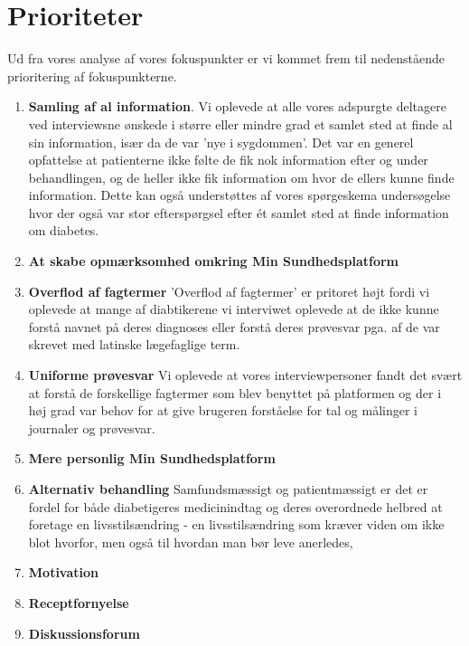 \section{Prioriteter}
Ud fra vores analyse af vores fokuspunkter er vi kommet frem til nedenstående prioritering af fokuspunkterne.\\
\begin{enumerate}
	\item \textbf{Samling af al information}. Vi oplevede at alle vores adspurgte deltagere ved interviewsne ønskede i større eller mindre grad et samlet sted at finde al sin information, især da de var 'nye i sygdommen'. Det var en generel opfattelse at patienterne ikke følte de fik nok information efter og under behandlingen, og de heller ikke fik information om hvor de ellers kunne finde information. Dette kan også understøttes af vores spørgeskema undersøgelse hvor der også var stor efterspørgsel efter ét samlet sted at finde information om diabetes.
	\item \textbf{At skabe opmærksomhed omkring Min Sundhedsplatform}
	\item \textbf{Overflod af fagtermer}
	'Overflod af fagtermer' er pritoret højt fordi vi oplevede at mange af diabtikerene vi interviwet oplevede at de ikke kunne forstå navnet på deres diagnoses eller forstå deres prøvesvar pga. af de var skrevet med latinske lægefaglige term.
	\item \textbf{Uniforme prøvesvar} Vi oplevede at vores interviewpersoner fandt det svært at forstå de forskellige fagtermer som blev benyttet på platformen og der i høj grad var behov for at give brugeren forståelse for tal og målinger i journaler og prøvesvar.
	\item \textbf{Mere personlig Min Sundhedsplatform}
	\item \textbf{Alternativ behandling} Samfundsmæssigt og patientmæssigt er det er fordel for både diabetigeres medicinindtag og deres overordnede helbred at foretage en livsstilsændring - en livsstilsændring som kræver viden om ikke blot hvorfor, men også til hvordan man bør leve anerledes, 
	\item \textbf{Motivation}
	\item \textbf{Receptfornyelse}
	\item \textbf{Diskussionsforum}
\end{enumerate}
